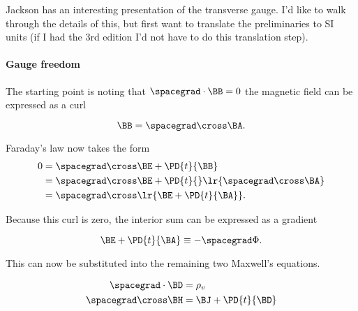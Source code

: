 
\renewcommand{\basename}{transverseGauge}
\renewcommand{\dirname}{notes/ece1228-electromagnetic-theory/}



\usepackage{peeters_layout_exercise}
\usepackage{peeters_braket}
\usepackage{peeters_figures}
\usepackage{siunitx}

\beginArtNoToc


Jackson \citep{jackson1975cew} has an interesting presentation of the transverse gauge.  I'd like to walk through the details of this, but first want to translate the preliminaries to SI units (if I had the 3rd edition I'd not have to do this translation step).

\paragraph{Gauge freedom}

The starting point is noting that \( \spacegrad \cdot \BB = 0 \) the magnetic field can be expressed as a curl

\begin{dmath}\label{eqn:transverseGauge:20}
\BB = \spacegrad \cross \BA.
\end{dmath}

Faraday's law now takes the form
\begin{dmath}\label{eqn:transverseGauge:40}
\begin{aligned}
0
&= \spacegrad \cross \BE + \PD{t}{\BB} \\
&= \spacegrad \cross \BE + \PD{t}{} \lr{ \spacegrad \cross \BA } \\
&= \spacegrad \cross \lr{ \BE + \PD{t}{\BA} }.
\end{aligned}
\end{dmath}

Because this curl is zero, the interior sum can be expressed as a gradient

\begin{dmath}\label{eqn:transverseGauge:60}
\BE + \PD{t}{\BA} \equiv -\spacegrad \Phi.
\end{dmath}

This can now be substituted into the remaining two Maxwell's equations.

\begin{dmath}\label{eqn:transverseGauge:80}
\begin{aligned}
\spacegrad \cdot \BD &= \rho_v \\
\spacegrad \cross \BH &= \BJ + \PD{t}{\BD} \\
\end{aligned}
\end{dmath}

